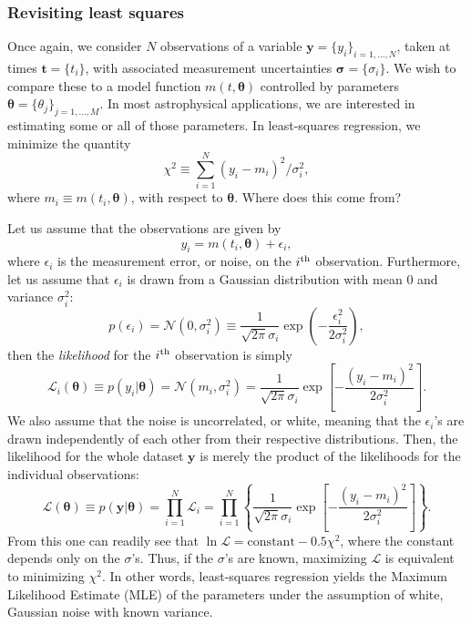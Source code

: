 \documentclass[letterpaper]{ar-1col}
\newcommand{\meanparams}{\ensuremath{\boldsymbol{\theta}}}
\begin{document}
\subsubsection{Revisiting least squares}\label{sec:lsq}

Once again, we consider $N$ observations of a variable $\mathbf{y} = \{ y_i\}_{i=1, \ldots, N}$, taken at times $\mathbf{t} = \{ t_i\}$, with associated measurement uncertainties $\boldsymbol{\sigma}=\{\sigma_i\}$. We wish to compare these to a model function $m(t,\meanparams)$ controlled by parameters $\meanparams=\{\theta_j\}_{j=1,\ldots,M}$. In most astrophysical applications, we are interested in estimating some or all of those parameters. In least-squares regression, we minimize the quantity
\begin{equation}
  \chi^2 \equiv\sum_{i=1}^N (y_i-m_i)^2/\sigma^2_i,
\end{equation}
where $m_i \equiv m(t_i,\meanparams)$, with respect to $\meanparams$. Where does this come from?

Let us assume that the observations are given by
\begin{equation}
  y_i=m(t_i,\meanparams)+\epsilon_i,
\end{equation}
where $\epsilon_i$ is the measurement error, or noise, on the $i^{\rm th}$ observation. Furthermore, let us assume that $\epsilon_i$ is drawn from a Gaussian distribution with mean $0$ and variance $\sigma_i^2$:
\begin{equation}
  p(\epsilon_i)=\mathcal{N}(0,\sigma_i^2) \equiv \frac{1}{\sqrt{2\pi} \sigma_i} \exp\left(-\frac{\epsilon_i^2}{2\sigma_i^2} \right),
\end{equation}
then the \emph{likelihood} for the $i^{\rm th}$ observation is simply
\begin{equation}
  \mathcal{L}_i (\meanparams) \equiv p(y_i|\meanparams)=\mathcal{N}(m_i,\sigma_i^2) =\frac{1}{\sqrt{2\pi} \sigma_i} \exp\left[-\frac{(y_i-m_i)^2}{2\sigma_i^2} \right].
\end{equation}
We also assume that the noise is uncorrelated, or white, meaning that the $\epsilon_i$'s are drawn independently of each other from their respective distributions. Then, the likelihood for the whole dataset $\mathbf{y}$ is merely the product of the likelihoods for the individual observations:
\begin{equation}
  \mathcal{L} (\meanparams) \equiv p(\mathbf{y}|\meanparams) = \prod_{i=1}^N \mathcal{L}_i = \prod_{i=1}^N \left\{ \frac{1}{\sqrt{2\pi} \sigma_i}
  \exp\left[-\frac{(y_i-m_i)^2}{2\sigma_i^2} \right] \right\}.
\end{equation}
From this one can readily see that $\ln \mathcal{L} = \mathrm{constant} - 0.5 \chi^2$, where the constant depends only on the $\sigma$'s. Thus, if the $\sigma$'s are known, maximizing $\mathcal{L}$ is equivalent to minimizing $\chi^2$. In other words, least-squares regression yields the Maximum Likelihood Estimate (MLE) of the parameters under the assumption of white, Gaussian noise with known variance.
\end{document}
